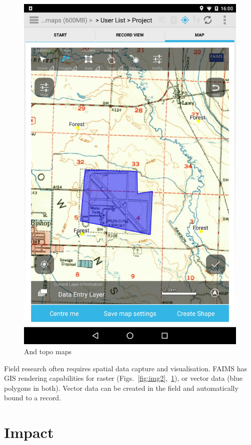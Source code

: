\documentclass[preprint,12pt, a4paper]{elsarticle}
\begin{document}
\begin{figure}[!htb]
\includegraphics[width=\linewidth]{image-3.jpg}
	\caption{And topo maps}
	\label{fig:img3}
\endminipage\hfill

\end{figure}



Field research often requires spatial data capture and visualisation. FAIMS has GIS rendering capabilities for raster (Figs.~\ref{fig:img2},~\ref{fig:img3}), or vector data (blue polygons in both). Vector data can be created in the field and automatically bound to a record. 


\section{Impact}
\end{document}
